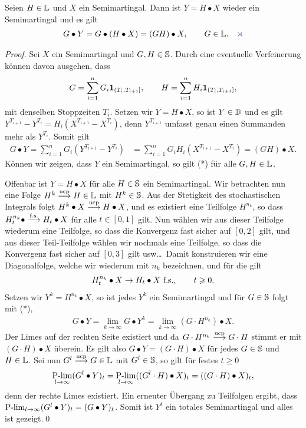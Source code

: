 \begin{theorem}
\label{prop:2.13}
 Seien $H\in\L$ und $X$ ein Semimartingal. Dann ist
  $Y=H\bullet X$ wieder ein Semimartingal und es gilt
\begin{align*}
G \bullet Y =G \bullet (H \bullet X) = (GH) \bullet X,\qquad
G\in \L.\fish
\end{align*}
\end{theorem}
\begin{proof}
Sei $X$ ein Semimartingal und $G,H\in \S$.
Durch eine eventuelle Verfeinerung können davon ausgehen, dass
\begin{align*}
G = \sum_{i=1}^n G_i \Id_{(T_i,T_{i+1}]},\qquad
H = \sum_{i=1}^n H_i \Id_{(T_i,T_{i+1}]},
\end{align*}
mit denselben Stoppzeiten $T_i$. Setzen wir $Y = H\bullet X$, so ist $Y\in \D$
und es gilt $Y^{T_{i+1}} - Y^{T_i} = H_i(X^{T_{i+1}}-X^{T_i})$, denn
$Y^{T_{i+1}}$ umfasst genau einen Summanden mehr als $Y^{T_i}$. Somit gilt
\begin{align*}
G\bullet Y = \sum_{i=1}^n G_i (Y^{T_{i+1}} - Y^{T_i})
& = \sum_{i=1}^n G_iH_i (X^{T_{i+1}} - X^{T_i}) = (GH)\bullet X.\tag{*}
\end{align*}
Können wir zeigen, dass $Y$ ein Semimartingal, so gilt  (*) für
alle $G, H\in \L$.

Offenbar ist $Y = H\bullet X$ für alle $H\in \S$ ein Semimartingal. Wir
betrachten nun eine Folge $H^k\ucpto H\in \L$ mit $H^k\in \S$. Aus der
Stetigkeit des stochastischen Integrals folgt $H^k\bullet X\ucpto H\bullet X$,
und es existiert eine Teilfolge $H^{n_k}$, so dass
$H_t^{n_k}\bullet \fsto H_t\bullet X$
für alle $t\in [0,1]$ gilt. Nun wählen wir aus dieser Teilfolge wiederum eine
Teilfolge, so dass die Konvergenz fast sicher auf $[0,2]$ gilt, und aus dieser
Teil-Teilfolge wählen wir nochmals eine Teilfolge, so dass die Konvergenz fast
sicher auf $[0,3]$ gilt usw\ldots\ Damit konstruieren wir eine Diagonalfolge, 
welche wir wiederum mit $n_k$ bezeichnen, und für die gilt
\begin{align*}
H_t^{n_k}\bullet X \to H_t\bullet X\ \fs,\qquad t\ge 0.
\end{align*}
Setzen wir $Y^k = H^{n_k}\bullet X$, so ist jedes $Y^k$
ein Semimartingal und für $G\in \S$ folgt mit (*),
\begin{align*}
G\bullet Y  = \lim\limits_{k\to \infty} G\bullet Y^k
= 
\lim\limits_{k\to \infty} (G\cdot H^{n_k})\bullet X.
\end{align*}
Der Limes auf der rechten Seite existiert und da $G\cdot H^{n_k}\ucpto G\cdot
H$ stimmt er mit $(G\cdot H)\bullet X$ überein. Es gilt also
 $G\bullet Y = (G\cdot H)\bullet X$ \fs
für jedes $G\in \S$ und $H\in \L$. 
Sei nun $G^l \ucpto G\in \L$ mit $G^l\in \S$,
so gilt für festes $t\ge 0$
\begin{align*}
\Plim_{l\to \infty} (G^l\bullet Y)_t = 
\Plim_{l\to \infty} ((G^l\cdot H)\bullet X)_t
= ((G\cdot H)\bullet X)_t,
\end{align*}
denn der rechte Limes existiert. Ein erneuter Übergang zu Teilfolgen ergibt,
dass $\Plim_{l\to \infty} (G^l\bullet Y)_t = (G\bullet Y)_t$. Somit ist $Y^t$
ein totales Semimartingal und alles ist gezeigt.\qed
\end{proof}

